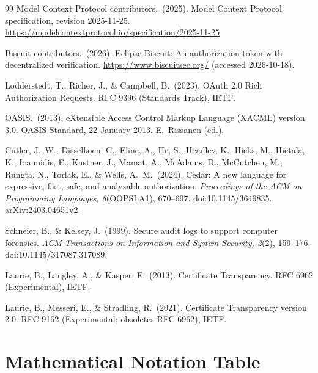 \documentclass[10pt,twocolumn]{article}
\begin{document}
\begin{thebibliography}{99}
Model Context Protocol contributors.\ (2025).
Model Context Protocol specification, revision 2025-11-25.
\url{https://modelcontextprotocol.io/specification/2025-11-25}

Biscuit contributors.\ (2026).
Eclipse Biscuit: An authorization token with decentralized verification.
\url{https://www.biscuitsec.org/} (accessed 2026-10-18).

Lodderstedt, T., Richer, J., \& Campbell, B.\ (2023).
OAuth 2.0 Rich Authorization Requests.
RFC 9396 (Standards Track), IETF.

OASIS.\ (2013).
eXtensible Access Control Markup Language (XACML) version 3.0.
OASIS Standard, 22 January 2013. E.~Rissanen (ed.).

Cutler, J.~W., Disselkoen, C., Eline, A., He, S., Headley, K., Hicks, M.,
Hietala, K., Ioannidis, E., Kastner, J., Mamat, A., McAdams, D.,
McCutchen, M., Rungta, N., Torlak, E., \& Wells, A.~M.\ (2024).
Cedar: A new language for expressive, fast, safe, and analyzable
authorization.
\emph{Proceedings of the ACM on Programming Languages, 8}(OOPSLA1),
670--697. doi:10.1145/3649835. arXiv:2403.04651v2.

Schneier, B., \& Kelsey, J.\ (1999).
Secure audit logs to support computer forensics.
\emph{ACM Transactions on Information and System Security, 2}(2),
159--176. doi:10.1145/317087.317089.

Laurie, B., Langley, A., \& Kasper, E.\ (2013).
Certificate Transparency.
RFC 6962 (Experimental), IETF.

Laurie, B., Messeri, E., \& Stradling, R.\ (2021).
Certificate Transparency version 2.0.
RFC 9162 (Experimental; obsoletes RFC 6962), IETF.

\end{thebibliography}

\appendix

\section{Mathematical Notation Table}
\label{app:math}
\end{document}
